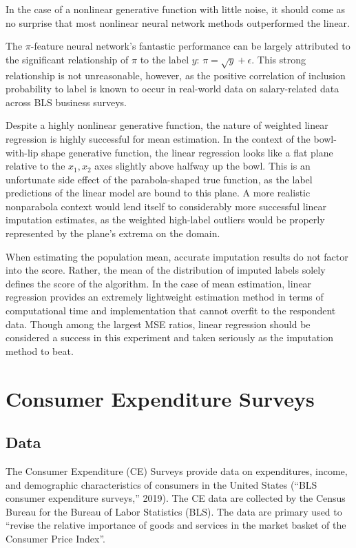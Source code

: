 \documentclass[12pt,twoside]{reedthesis}
\begin{document}
In the case of a nonlinear generative function with little noise, it
should come as no surprise that most nonlinear neural network methods
outperformed the linear.

The \(\pi\)-feature neural network's fantastic performance can be
largely attributed to the significant relationship of \(\pi\) to the
label \(y\): \(\pi = \sqrt{y} + \epsilon\). This strong relationship is
not unreasonable, however, as the positive correlation of inclusion
probability to label is known to occur in real-world data on
salary-related data across BLS business surveys.

Despite a highly nonlinear generative function, the nature of weighted
linear regression is highly successful for mean estimation. In the
context of the bowl-with-lip shape generative function, the linear
regression looks like a flat plane relative to the \(x_1, x_2\) axes
slightly above halfway up the bowl. This is an unfortunate side effect
of the parabola-shaped true function, as the label predictions of the
linear model are bound to this plane. A more realistic nonparabola
context would lend itself to considerably more successful linear
imputation estimates, as the weighted high-label outliers would be
properly represented by the plane's extrema on the domain.

When estimating the population mean, accurate imputation results do not
factor into the score. Rather, the mean of the distribution of imputed
labels solely defines the score of the algorithm. In the case of mean
estimation, linear regression provides an extremely lightweight
estimation method in terms of computational time and implementation that
cannot overfit to the respondent data. Though among the largest MSE
ratios, linear regression should be considered a success in this
experiment and taken seriously as the imputation method to beat.

\chapter{Consumer Expenditure
Surveys}\label{consumer-expenditure-surveys}

\section{Data}\label{data}

The Consumer Expenditure (CE) Surveys provide data on expenditures,
income, and demographic characteristics of consumers in the United
States (``BLS consumer expenditure surveys,'' 2019). The CE data are
collected by the Census Bureau for the Bureau of Labor Statistics (BLS).
The data are primary used to ``revise the relative importance of goods
and services in the market basket of the Consumer Price Index''.
\end{document}
